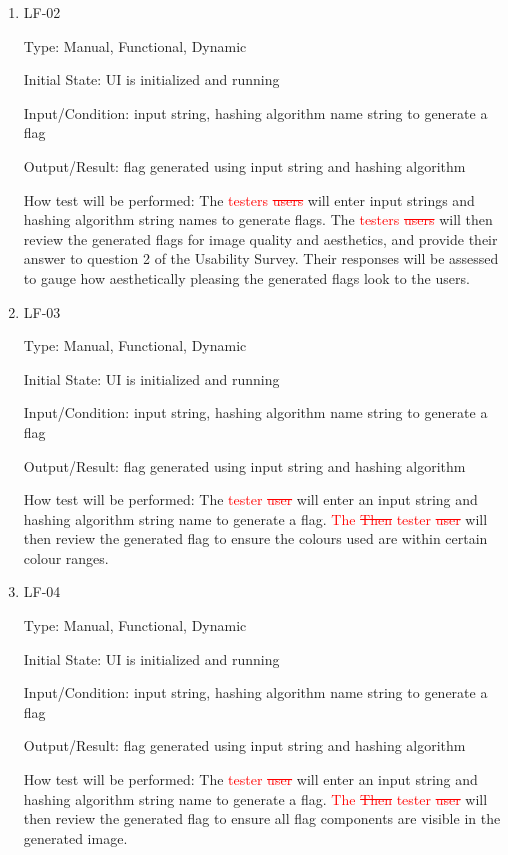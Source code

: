 \documentclass[12pt, titlepage]{article}
\begin{document}
\begin{enumerate}

\item{LF-02\\}

Type: Manual, Functional, Dynamic

Initial State: UI is initialized and running

Input/Condition: input string, hashing algorithm name string to generate a
flag

Output/Result: flag generated using input string and hashing algorithm

How test will be performed: The \textcolor{red}{testers \sout{users}} will
enter input strings and hashing algorithm string names to generate flags. The
\textcolor{red}{testers \sout{users}} will then review the generated flags for
image quality and aesthetics, and provide their answer to question 2 of the
Usability Survey. Their responses will be assessed to gauge how aesthetically
pleasing the generated flags look to the users.

\item{LF-03\\}

Type: Manual, Functional, Dynamic

Initial State: UI is initialized and running

Input/Condition: input string, hashing algorithm name string to generate a
flag

Output/Result: flag generated using input string and hashing algorithm

How test will be performed: The \textcolor{red}{tester \sout{user}} will
enter an input string and hashing algorithm string name to generate a flag.
\textcolor{red}{The \sout{Then} tester \sout{user}} will then review the
generated flag to ensure the colours used are within certain colour ranges.

\item{LF-04\\}

Type: Manual, Functional, Dynamic

Initial State: UI is initialized and running

Input/Condition: input string, hashing algorithm name string to generate a
flag

Output/Result: flag generated using input string and hashing algorithm

How test will be performed: The \textcolor{red}{tester \sout{user}} will enter
an input string and hashing algorithm string name to generate a flag.
\textcolor{red}{The \sout{Then} tester \sout{user}} will then review the
generated flag to ensure all flag components are visible in the generated
image.

\end{enumerate}
\end{document}
